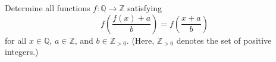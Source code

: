 Determine all functions $f\colon \mathbb{Q} \longrightarrow \mathbb{Z}$ satisfying
\[ f\left(\frac{f(x)+a}{b}\right) = f\left(\frac{x+a}{b}\right) \]
for all $x \in \mathbb{Q}$, $a \in \mathbb{Z}$, and $b \in \mathbb{Z}_{>0}$. (Here, $\mathbb{Z}_{>0}$ denotes the set of positive integers.)
